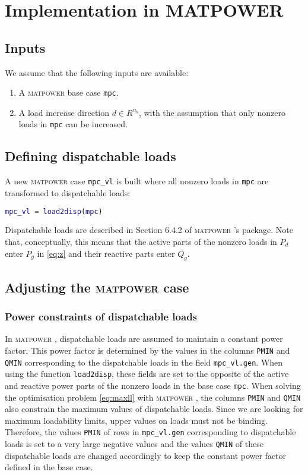 \documentclass[12pt,a4]{article}
\newcommand*{\codemat}[1]{\texttt{#1}}
\newcommand*{\matpower}{\textsc{matpower} }
\begin{document}
\section{Implementation in MATPOWER}
\label{sec:impl-matp}

\subsection{Inputs}
\label{sec:inputs}

We assume that the following inputs are available:
\begin{enumerate}
\item A \matpower base case \codemat{mpc}.
\item A load increase direction $d \in R^{n_b}$, with the assumption that only nonzero loads in \codemat{mpc} can be increased.
\end{enumerate}

\subsection{Defining dispatchable loads}
\label{sec:defin-disp-loads}

A new \matpower case \codemat{mpc\_vl} is built where all nonzero loads in \codemat{mpc} are transformed to dispatchable loads:
\begin{lstlisting}[language=Matlab]
mpc_vl = load2disp(mpc)  
\end{lstlisting}
Dispatchable loads are described in Section 6.4.2 of \matpower's package.
Note that, conceptually, this means that the active parts of the nonzero loads in $P_d$ enter $P_g$ in \eqref{eq:z} and their reactive parts enter $Q_g$.

\subsection{Adjusting the \matpower case}
\label{sec:adjust-matp-case}

\subsubsection{Power constraints of dispatchable loads}
\label{sec:limits-disp-loads}

In \matpower, dispatchable loads are assumed to maintain a constant power factor. 
This power factor is determined by the values in the columns \codemat{PMIN} and \codemat{QMIN} corresponding to the dispatchable loads in the field \codemat{mpc\_vl.gen}.
When using the function \codemat{load2disp}, these fields are set to the opposite of the active and reactive power parts of the nonzero loads in the base case \codemat{mpc}.
When solving the optimisation problem \eqref{eq:maxll} with \matpower, the columns \codemat{PMIN} and \codemat{QMIN} also constrain the maximum values of dispatchable loads.
Since we are looking for maximum loadability limits, upper values on loads must not be binding.
Therefore, the values \codemat{PMIN} of rows in \codemat{mpc\_vl.gen} corresponding to dispatchable loads is set to a very large negative values and the values \codemat{QMIN} of these dispatchable loads are changed accordingly to keep the constant power factor defined in the base case.
\end{document}
